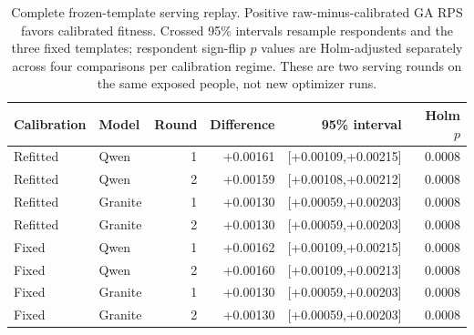 \begin{table}[H]\centering\small
\caption{Complete frozen-template serving replay. Positive raw-minus-calibrated GA RPS favors calibrated fitness. Crossed 95\% intervals resample respondents and the three fixed templates; respondent sign-flip $p$ values are Holm-adjusted separately across four comparisons per calibration regime. These are two serving rounds on the same exposed people, not new optimizer runs.}
\label{tab:serving-replay}
\begin{tabular}{@{}llrrrr@{}}\toprule
Calibration & Model & Round & Difference & 95\% interval & Holm $p$\\\midrule
Refitted & Qwen & 1 & +0.00161 & [+0.00109,+0.00215] & 0.0008\\
Refitted & Qwen & 2 & +0.00159 & [+0.00108,+0.00212] & 0.0008\\
Refitted & Granite & 1 & +0.00130 & [+0.00059,+0.00203] & 0.0008\\
Refitted & Granite & 2 & +0.00130 & [+0.00059,+0.00203] & 0.0008\\
Fixed & Qwen & 1 & +0.00162 & [+0.00109,+0.00215] & 0.0008\\
Fixed & Qwen & 2 & +0.00160 & [+0.00109,+0.00213] & 0.0008\\
Fixed & Granite & 1 & +0.00130 & [+0.00059,+0.00203] & 0.0008\\
Fixed & Granite & 2 & +0.00130 & [+0.00059,+0.00203] & 0.0008\\
\bottomrule\end{tabular}\end{table}
